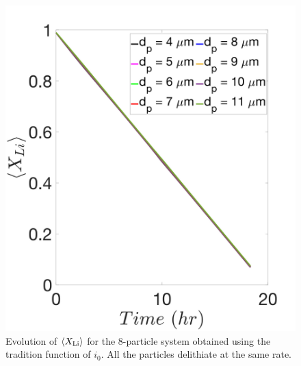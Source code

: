 \documentclass{article}
\begin{document}
\begin{figure}
  \includegraphics{figures/i0_basic.png}
  \caption{Evolution of $\left<X_{\rm{Li}}\right>$ for the 8-particle
    system obtained using the tradition function of $i_0$. All the
    particles delithiate at the same rate.}
  \label{fig:i0_basic}
\end{figure}
\end{document}
